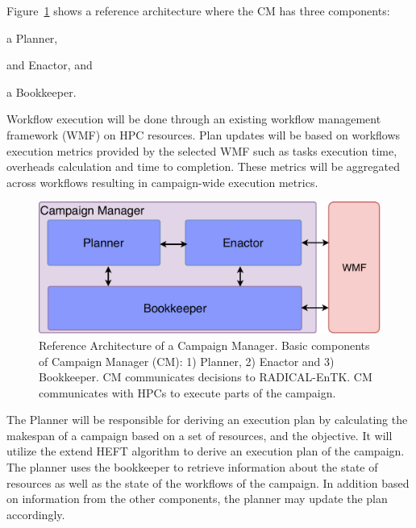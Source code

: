 Figure~\ref{fig:refarch} shows a reference architecture where the CM has three components:
\begin{inparaenum}[(1)]
\item a Planner,
\item and Enactor, and
\item a Bookkeeper. 
\end{inparaenum}
Workflow execution will be done through an existing workflow management framework (WMF) on HPC resources.
Plan updates will be based on workflows execution metrics provided by the selected WMF such as tasks execution time, overheads calculation and time to completion.
These metrics will be aggregated across workflows resulting in campaign-wide execution metrics.

\begin{figure}[t]
    \centering
    \includegraphics[width=.95\textwidth]{figures/CEM_design.pdf}
    \caption{Reference Architecture of a Campaign Manager. Basic 
    components of Campaign Manager (CM): 1) Planner, 2) Enactor and 3) Bookkeeper. 
    CM communicates decisions to RADICAL-EnTK. CM communicates with HPCs to 
    execute parts of the campaign.}\label{fig:refarch}
\end{figure}

The Planner will be responsible for deriving an execution plan by calculating  the makespan of a campaign based on a set of resources, and the objective.
It will utilize the extend HEFT algorithm to derive an execution plan of the campaign. 
The planner uses the bookkeeper to retrieve information about the state of resources as well as the state of the workflows of the campaign.
In addition based on information from the other components, the planner may update the plan accordingly. 


